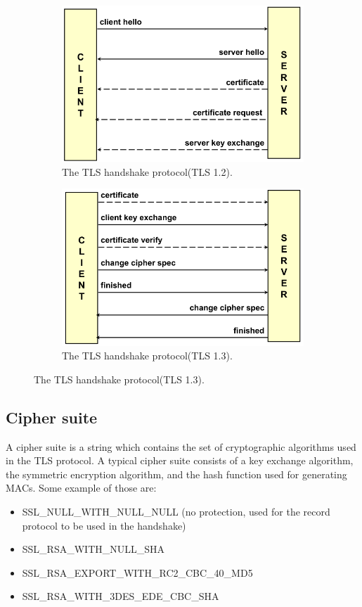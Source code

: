 \begin{figure}[H]
  \centering
  \begin{subfigure}{.5\textwidth}
    \centering
    \includegraphics[width=.9\linewidth]{img/TLS key echange.png}
    \caption{The TLS handshake protocol(TLS 1.2).}
    \label{fig:tls-handshake-protocol-1.2}
  \end{subfigure}%
  \begin{subfigure}{.5\textwidth}
    \centering
    \includegraphics[width=.9\linewidth]{img/TLS key exchange 1-3.png}
    \caption{The TLS handshake protocol(TLS 1.3).}
    \label{fig:tls-handshake-protocol-1.3}
  \end{subfigure}
\end{figure}

\subsection{Cipher suite}
A cipher suite is a string which contains the set of cryptographic
algorithms used in the TLS protocol. A typical cipher suite consists
of a key exchange algorithm, the symmetric encryption algorithm, and
the hash function used for generating MACs.
Some example of those are:
\begin{itemize}
  \item SSL\_NULL\_WITH\_NULL\_NULL (no protection, used for the record
    protocol to be used in the handshake)
  \item SSL\_RSA\_WITH\_NULL\_SHA
  \item SSL\_RSA\_EXPORT\_WITH\_RC2\_CBC\_40\_MD5
  \item SSL\_RSA\_WITH\_3DES\_EDE\_CBC\_SHA
\end{itemize}


